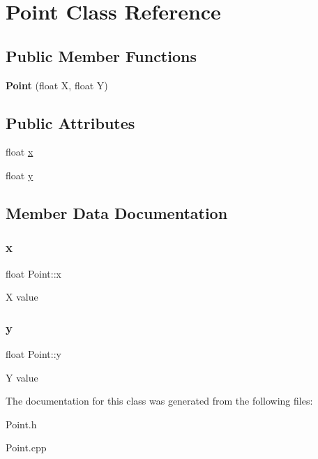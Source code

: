 \hypertarget{class_point}{}\section{Point Class Reference}
\label{class_point}
\subsection*{Public Member Functions}
\begin{DoxyCompactItemize}
\item 
\mbox{\label{class_point_a218666f0822d08b9b00adfbf56984687}} 
{\bfseries Point} (float X, float Y)
\end{DoxyCompactItemize}
\subsection*{Public Attributes}
\begin{DoxyCompactItemize}
\item 
float \mbox{\hyperlink{class_point_a05dfe2dfbde813ad234b514f30e662f1}{x}}
\item 
float \mbox{\hyperlink{class_point_a6101960c8d2d4e8ea1d32c9234bbeb8d}{y}}
\end{DoxyCompactItemize}


\subsection{Member Data Documentation}
\mbox{\label{class_point_a05dfe2dfbde813ad234b514f30e662f1}} 
\subsubsection{\texorpdfstring{x}{x}}
{\footnotesize\ttfamily float Point\+::x}

X value \mbox{\label{class_point_a6101960c8d2d4e8ea1d32c9234bbeb8d}} 
\subsubsection{\texorpdfstring{y}{y}}
{\footnotesize\ttfamily float Point\+::y}

Y value 

The documentation for this class was generated from the following files\+:\begin{DoxyCompactItemize}
\item 
Point.\+h\item 
Point.\+cpp\end{DoxyCompactItemize}
